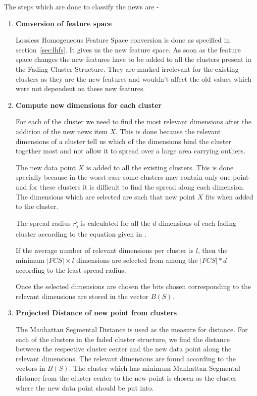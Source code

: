 \documentclass[review,twocolumn,5p]{elsarticle}
\begin{document}
The steps which are done to classify the news are - 
\begin{enumerate}
\item \textbf{Conversion of feature space}

Lossless Homogeneous Feature Space conversion is done as specified in section~\ref{sec:lhfs}. It gives us the new feature space. As soon as the feature space changes the new features have to be added to all the clusters present in the Fading Cluster Structure. They are marked irrelevant for the existing clusters as they are the new features and wouldn't affect the old values which were not dependent on these new features. 

\item \textbf{Compute new dimensions for each cluster}

For each of the cluster we need to find the most relevant dimensions after the addition of the new news item $X$. This is done because the relevant dimensions of a cluster tell us which of the dimensions bind the cluster together most and not allow it to spread over a large area carrying outliers. 

The new data point $X$ is added to all the existing clusters. This is done specially because in the worst case some clusters may contain only one point and for these clusters it is difficult to find the spread along each dimension. The dimensions which are selected are such that new point $X$ fits when added to the cluster.

The spread radius $r_j^i$ is calculated for all the $d$ dimensions of each fading cluster according to the equation given in \cite{Aggarwal:2005}.

If the average number of relevant dimensions per cluster is $l$, then the minimum $|FCS| \times l$ dimensions are selected from among the $|FCS|*d$ according to the least spread radius. 

Once the selected dimensions are chosen the bits chosen corresponding to the relevant dimensions are stored in the vector $B(S)$.

\item \textbf{Projected Distance of new point from clusters}

The Manhattan Segmental Distance is used as the measure for distance. For each of the clusters in the faded cluster structure, we find the distance between the respective cluster center and the new data point along the relevant dimensions. The relevant dimensions are found according to the vectors in $B(S)$. The cluster which has minimum Manhattan Segmental distance from the cluster center to the new point is chosen as the cluster where the new data point should be put into. 


\end{enumerate}
\end{document}
